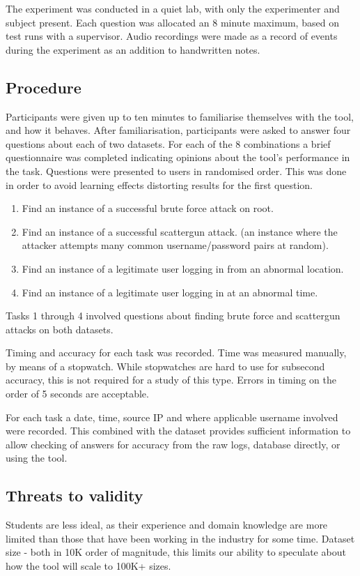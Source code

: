 The experiment was conducted in a quiet lab, with only the experimenter and subject present. Each question was allocated an 8 minute maximum, based on test runs with a supervisor. Audio recordings were made as a record of events during the experiment as an addition to handwritten notes. 

\subsection{Procedure}
Participants were given up to ten minutes to familiarise themselves with the tool, and how it behaves. After familiarisation, participants were asked to answer four questions about each of two datasets. For each of the 8 combinations a brief questionnaire was completed indicating opinions about the tool's performance in the task\cite{lewis1995ibm}.
Questions were presented to users in randomised order. This was done in order to avoid learning effects distorting results for the first question.

\begin{enumerate}
\item{Find an instance of a successful brute force attack on root.}
\item{Find an instance of a successful scattergun attack.
(an instance where the attacker attempts many common username/password pairs at random).}
\item{Find an instance of a legitimate user logging in from an abnormal location.}
\item{Find an instance of a legitimate user logging in at an abnormal time.}
\end{enumerate}

Tasks 1 through 4 involved questions about finding brute force and scattergun attacks on both datasets.

Timing and accuracy for each task was recorded. 
Time was measured manually, by means of a stopwatch. While stopwatches are hard to use for subsecond accuracy, this is not required for a study of this type. Errors in timing on the order of 5 seconds are acceptable.

For each task a date, time, source IP and where applicable username involved were recorded. This combined with the dataset provides sufficient information to allow checking of answers for accuracy from the raw logs, database directly, or using the tool. 

\subsection{Threats to validity}
 Students are less ideal, as their experience and domain knowledge are more limited than those that have been working in the industry for some time.
Dataset size - both in 10K order of magnitude, this limits our ability to speculate about how the tool will scale to 100K+ sizes. 

